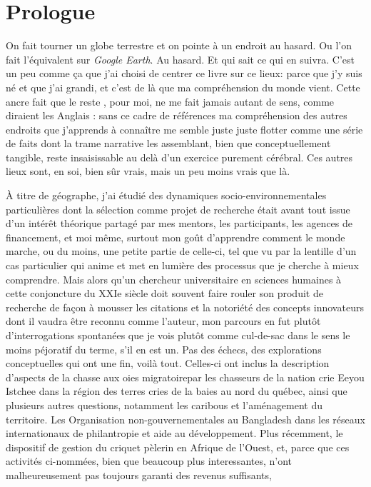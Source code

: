 \documentclass[12pt]{report}
\begin{document}
\chapter*{Prologue}

On fait tourner un globe terrestre et on pointe à un endroit au hasard. Ou l'on fait l'équivalent sur \emph{Google Earth}. Au hasard. Et qui sait ce qui en suivra. C'est un peu comme ça que j'ai choisi de centrer ce livre sur ce lieux: parce que j'y suis né et que j'ai grandi, et c'est de là que ma compréhension du monde vient. Cette ancre fait que \og le reste \fg, pour moi, ne me fait jamais autant de sens, comme diraient les Anglais : sans ce cadre de références ma compréhension des autres endroits que j'apprends à connaître me semble juste juste \og flotter \fg  comme une série de faits dont la trame narrative les assemblant, bien que conceptuellement tangible, reste insaisissable au delà d'un exercice purement cérébral. Ces autres lieux sont, en soi, bien sûr vrais, mais un peu moins vrais que là.  

À titre de géographe, j'ai étudié des dynamiques socio-environnementales particulières dont la sélection comme projet de recherche était avant tout issue d'un intérêt théorique partagé par mes mentors, les participants, les agences de financement, et moi même, surtout mon goût d'apprendre comment le monde marche, ou du moins, une petite partie de celle-ci, tel que vu par la lentille d'un cas particulier qui anime et met en lumière des processus que je cherche à mieux comprendre. Mais alors qu'un chercheur universitaire en sciences humaines à cette conjoncture du XXIe siècle doit souvent faire rouler son produit de recherche de façon à mousser les citations et la notoriété des concepts innovateurs dont il vaudra être reconnu comme l'auteur, mon parcours en fut plutôt d'interrogations spontanées que je vois plutôt comme cul-de-sac dans le sens le moins péjoratif du terme, s'il en est un. Pas des échecs, des explorations conceptuelles qui ont une fin, voilà tout. Celles-ci ont inclus la description d'aspects de la chasse aux oies migratoirepar les chasseurs de la nation crie Eeyou Istchee dans la région des terres cries de la baies au nord du québec, ainsi que plusieurs autres questions, notamment les caribous et l'aménagement du territoire. Les Organisation non-gouvernementales au Bangladesh dans les réseaux internationaux de philantropie et aide au développement. Plus récemment, le dispositif de gestion du criquet pèlerin en Afrique de l'Ouest, et, parce que ces activités ci-nommées, bien que beaucoup plus interessantes, n'ont malheureusement pas toujours garanti des revenus suffisants, 
 
\end{document}

